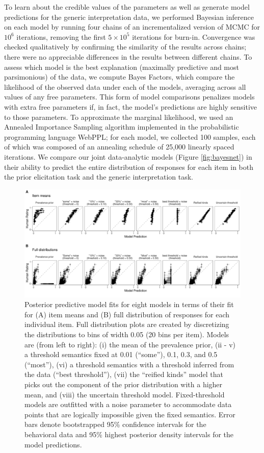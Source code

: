 \documentclass[floatsintext,doc]{apa6}
\begin{document}
To learn about the credible values of the parameters as well as generate model predictions for the generic interpretation data, we performed Bayesian inference on each model by running four chains of an incrementalized version of MCMC \cite{Ritchie2016} for $10^6$ iterations, removing the first $5 \times 10^5$ iterations for burn-in.
Convergence was checked qualitatively by confirming the similarity of the results across chains; there were no appreciable differences in the results between different chains.
To assess which model is the best explanation (maximally predictive and most parsimonious) of the data, we compute Bayes Factors, which compare the likelihood of the observed data under each of the models, averaging across all values of any free parameters.
This form of model comparisons penalizes models with extra free parameters if, in fact, the model's predictions are highly sensitive to those parameters.
To approximate the marginal likelihood, we used an Annealed Importance Sampling algorithm \cite{neal2001annealed} implemented in the probabilistic programming language WebPPL; for each model, we collected 100 samples, each of which was composed of an annealing schedule of 25,000 linearly spaced iterations.
We compare our joint data-analytic models (Figure \ref{fig:bayesnet}) in their ability to predict the entire distribution of responses for each item in both the prior elicitation task and the generic interpretation task. 


\begin{figure}
\centering
\includegraphics{figs/genint-modelingResults-plotgrid-scatters.pdf}
\caption{\label{fig:genint-modelingResults}Posterior predictive model fits for eight models in terms of their fit for (A) item means and (B) full distribution of responses for each individual item. Full distribution plots are created by discretizing the distributions to bins of width 0.05 (20 bins per item). Models are (from left to right): (i) the mean of the prevalence prior, (ii - v) a threshold semantics fixed at 0.01 (\enquote{some}), 0.1, 0.3, and 0.5 (``most''), (vi) a threshold semantics with a threshold inferred from the data (``best threshold''), (vii) the ``reified kinds'' model that picks out the component of the prior distribution with a higher mean, and (viii) the uncertain threshold model. Fixed-threshold models are outfitted with a noise parameter to accommodate data points that are logically impossible given the fixed semantics. Error bars denote bootstrapped 95\% confidence intervals for the behavioral data and 95\% highest posterior density intervals for the model predictions.}
\end{figure}
\end{document}
